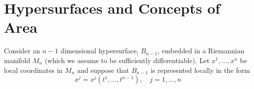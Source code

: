 %
%
%
%
\section{Hypersurfaces and Concepts of Area}
Consider an $n-1$ dimensional hypersurface, $B_{n-1}$, embedded in a Riemannian manifold $M_n$ (which we assume to be sufficiently differentiable). Let $x^1,...,x^n$ be local coordinates in $M_n$ and suppose that
$B_{n-1}$ is represented locally in the form 
\[ x^j = x^j(t^1, ..., t^{n-1}),  \quad j = 1,...,n \] 

